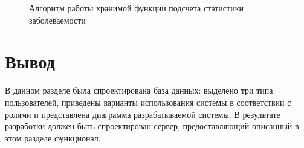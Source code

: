 \begin{figure}[!h]
	\caption{Алгоритм работы хранимой функции подсчета статистики заболеваемости}
\end{figure}

\section*{Вывод}

В данном разделе была спроектирована база данных: выделено три типа пользователей, приведены варианты использования системы в соответствии с ролями и представлена диаграмма разрабатываемой системы. В результате разработки должен быть спроектирован сервер, предоставляющий описанный в этом разделе функционал.